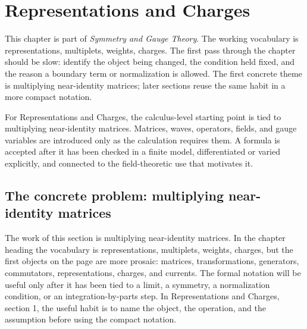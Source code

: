 \chapter{Representations and Charges}


This chapter is part of \emph{Symmetry and Gauge Theory}.  The working vocabulary is representations, multiplets, weights, charges.  The first pass through the chapter should be slow: identify the object being changed, the condition held fixed, and the reason a boundary term or normalization is allowed.  The first concrete theme is multiplying near-identity matrices; later sections reuse the same habit in a more compact notation.

For Representations and Charges, the calculus-level starting point is tied to multiplying near-identity matrices.  Matrices, waves, operators, fields, and gauge variables are introduced only as the calculation requires them.  A formula is accepted after it has been checked in a finite model, differentiated or varied explicitly, and connected to the field-theoretic use that motivates it.

\section{The concrete problem: multiplying near-identity matrices}













The work of this section is multiplying near-identity matrices.  In the chapter heading the vocabulary is representations, multiplets, weights, charges, but the first objects on the page are more prosaic: matrices, transformations, generators, commutators, representations, charges, and currents.  The formal notation will be useful only after it has been tied to a limit, a symmetry, a normalization condition, or an integration-by-parts step.  In Representations and Charges, section 1, the useful habit is to name the object, the operation, and the assumption before using the compact notation.

